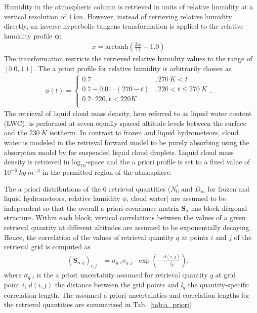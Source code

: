 \documentclass[journal abbreviation, manuscript]{copernicus}
\providecommand{\DIFaddbegin}{} %
\providecommand{\DIFaddend}{} %
\providecommand{\DIFdelbegin}{} %
\providecommand{\DIFdelend}{} %
\begin{document}
Humidity in the atmospheric column is retrieved in units of relative humidity at
a vertical resolution of $1\ \unit{km}$. However, instead of retrieving relative
humidity directly, an inverse hyperbolic tangens transformation is applied to
the relative humidity profile $\mathbf{\phi}$:
%
\begin{align}
x = \text{arctanh}(\frac{2 \mathbf{\phi}}{1.1} - 1.0)
\end{align}
%
The transformation restricts the retrieved relative humidity values to
the range of $[0.0, 1.1]$. The a priori profile for relative humidity
is arbitrarily chosen as
%
\begin{align}
\phi(t) = \DIFdelbegin %
\DIFdelend \DIFaddbegin \begin{cases}
 0.7 &, 270\ \unit{K} < t \\
 0.7 - 0.01 \cdot (270 -t) & ,220 < t \leq  270\ \unit{K} \\
 0.2 \cdot 220 ,t < 220 \unit{K} \\
 \end{cases}\DIFaddend .
\end{align}
%
The retrieval of liquid cloud mass density, here referred to as liquid water
content (LWC), is performed at seven equally spaced altitude levels between the
surface and the $230\ \unit{K}$ isotherm. In contrast to frozen and liquid
hydrometeors, cloud water is modeled in the retrieval forward model to be purely
absorbing using the absorption model by \cite{liebe93} for suspended liquid
cloud droplets. Liquid cloud mass density is retrieved in
$\text{log}_{10}$-space and the a priori profile is set to a fixed value of
$10^{-6}\ \unit{kg\ m^{-3}}$ in the permitted region of the atmosphere.

The a priori distributions of the 6 retrieval quantities ($N_0^*$ and $D_m$ for
frozen and liquid hydrometeors, relative humidity $\phi$, cloud water) are
assumed to be independent so that the overall a priori covariance matrix
$\mathbf{S}_a$ has block-diagonal structure. Within each block, vertical
correlations between the values of a given retrieval quantity at different
altitudes are assumed to be exponentially decaying. Hence, the correlation of
the values of retrieval quantity $q$ at points $i$ and $j$ of the retrieval grid
is computed as
%
\begin{align}
\left ( \mathbf{S}_{a,q} \right )_{i, j} &= \sigma_{q,i} \sigma_{q,j}
 \cdot \exp  \left ( -\frac{d(i, j)}{l_q} \right ),
\end{align}
%
where $\sigma_{q, i}$ is the a priori uncertainty assumed for retrieval
quantity $q$ at grid point $i$, $d(i, j)$ the distance between the grid
points and $l_q$ the quantity-specific correlation length. The assumed
a priori uncertainties and correlation lengths for the retrieval quantities
are summarized in Tab.~\ref{tab:a_priori}.
\end{document}
